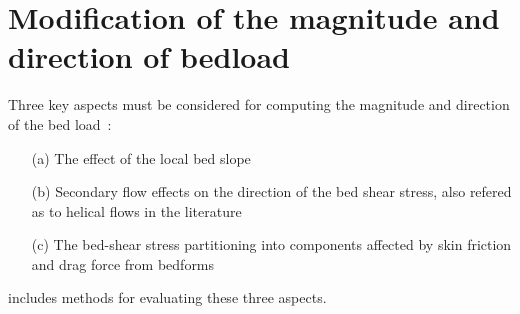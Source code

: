 \section{Modification of the magnitude and direction of bedload}
Three key aspects must be considered for computing the magnitude and direction of the bed load~\cite{Abad08}:
\begin{itemize}
\item[(a)] The effect of the local bed slope
\item[(b)] Secondary flow effects on the direction of the bed shear stress, also refered as to helical flows in the literature
\item[(c)] The bed-shear stress partitioning into components affected by skin friction and drag force from bedforms
\end{itemize}
\noindent
\sisyphe{} includes methods for evaluating these three aspects.

